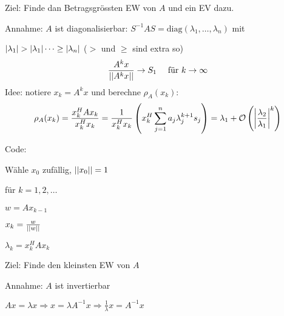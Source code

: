 Ziel: Finde dan Betragsgrössten EW von $A$ und ein EV dazu.

Annahme: $A$ ist diagonalisierbar: $S^{-1} A S = \text{diag} (\lambda_1,\dots,\lambda_n)$
mit 

\hspace{45pt} $\left\vert \lambda_1 \right\vert > \left\vert \lambda_1 \right\vert \dots \geq \left\vert \lambda_n \right\vert$
($>$ und $\geq$ sind extra so)
\begin{align*}
    \frac{A^k x}{\left\vert\left\vert A^k x \right\vert\right\vert} \rightarrow S_1
    \quad \text{ für } k \rightarrow \infty
\end{align*}
Idee: notiere $x_k = A^k x$ und berechne $\rho_A (x_k)$:
\begin{align*}
    \rho_A (x_k) = \frac{x_k^H A x_k}{x_k^H x_k}
    = \frac{1}{x_k^H x_k} \left( x_k^H \sum_{j=1}^n a_j \lambda_j^{k+1} s_j \right)
    = \lambda_1 + \mathcal{O} \left( \left\vert \frac{\lambda_2}{\lambda_1} \right\vert^k \right)
\end{align*}

Code:

Wähle $x_0$ zufällig, $\left\vert\left\vert x_0 \right\vert\right\vert = 1$

für $k=1,2,\dots$

\hspace{12pt} $w=Ax_{k-1}$

\hspace{12pt} $x_k = \frac{w}{\left\vert\left\vert w \right\vert\right\vert}$

\hspace{12pt} $\lambda_k = x_k^H A x_k$

\vspace{1\baselineskip}


\vspace{1\baselineskip}


\vspace{1\baselineskip}

\underline{}

Ziel: Finde den kleinsten EW von $A$

Annahme: $A$ ist invertierbar

$Ax=\lambda x \Rightarrow x = \lambda A^{-1} x \Rightarrow \frac{1}{\lambda} x = A^{-1} x$

